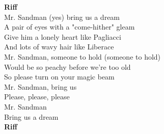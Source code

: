 \textbf{Riff}\\
Mr. Sandman (yes) bring us a dream\\
A pair of eyes with a "come-hither" gleam\\
Give him a lonely heart like Pagliacci\\
And lots of wavy hair like Liberace\\
Mr. Sandman, someone to hold (someone to hold)\\
Would be so peachy before we're too old\\
So please turn on your magic beam\\
Mr. Sandman, bring us\\
Please, please, please\\
Mr. Sandman\\
Bring us  a dream\\
\textbf{Riff}\\
